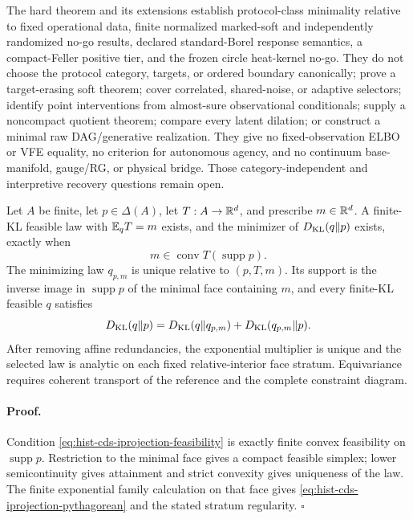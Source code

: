 The hard theorem and its extensions establish protocol-class minimality
relative to fixed operational data, finite normalized marked-soft and
independently randomized no-go results, declared standard-Borel response
semantics, a compact-Feller positive tier, and the frozen circle heat-kernel
no-go.  They do not choose the protocol category, targets, or ordered boundary
canonically; prove a target-erasing soft theorem; cover correlated,
shared-noise, or adaptive selectors; identify point interventions from
almost-sure observational conditionals; supply a noncompact quotient theorem;
compare every latent dilation; or construct a minimal raw DAG/generative
realization.  They give no fixed-observation ELBO or VFE equality, no
criterion for autonomous agency, and no continuum base-manifold, gauge/RG,
or physical bridge.  Those category-independent and interpretive recovery
questions remain open.  

Let \(A\) be finite, let \(p\in\Delta(A)\), let
\(T:A\to\mathbb R^d\), and prescribe \(m\in\mathbb R^d\).  A finite-KL feasible law with
\(\mathbb E_qT=m\) exists, and the minimizer of \(D_{\mathrm{KL}}(q\Vert p)\) exists, exactly
when
\begin{equation}
m\in\operatorname{conv}T(\operatorname{supp}p).
\label{eq:hist-cds-iprojection-feasibility}
\end{equation}
The minimizing law \(q_{p,m}\) is unique relative to \((p,T,m)\).  Its support is the inverse image
in \(\operatorname{supp}p\) of the minimal face containing \(m\), and every
finite-KL feasible \(q\) satisfies
\begin{equation}
D_{\mathrm{KL}}(q\Vert p)
=D_{\mathrm{KL}}(q\Vert q_{p,m})+D_{\mathrm{KL}}(q_{p,m}\Vert p).
\label{eq:hist-cds-iprojection-pythagorean}
\end{equation}
After removing affine redundancies, the exponential multiplier is unique and
the selected law is analytic on each fixed relative-interior face stratum.
Equivariance requires coherent transport of the reference and the complete
constraint diagram.  

\paragraph{Proof.}
Condition \eqref{eq:hist-cds-iprojection-feasibility} is exactly finite
convex feasibility on \(\operatorname{supp}p\).  Restriction to the minimal
face gives a compact feasible simplex; lower semicontinuity gives attainment
and strict convexity gives uniqueness of the law.  The finite exponential
family calculation on that face gives
\eqref{eq:hist-cds-iprojection-pythagorean} and the stated stratum
regularity.  \(\square\)

